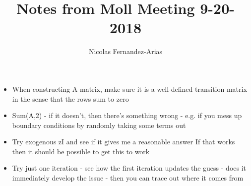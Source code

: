 \documentclass[12pt,english]{article}
\theoremstyle{remark}
\begin{document}
	
	\title{Notes from Moll Meeting 9-20-2018}
	\author{Nicolas Fernandez-Arias}
	\maketitle

\begin{itemize}
	\item When constructing A matrix, make sure it is a well-defined transition matrix in the sense that the rows sum to zero
	\item Sum(A,2) - if it doesn't, then there's something wrong - e.g. if you mess up boundary conditions by randomly taking some terms out
	\item Try exogenous zI and see if it gives me a reasonable answer
	If that works then it should be possible to get this to work
	\item Try just one iteration - see how the first iteration updates the guess - does it immediately develop the issue - then you can trace out where it comes from
\end{itemize}
\end{document}
